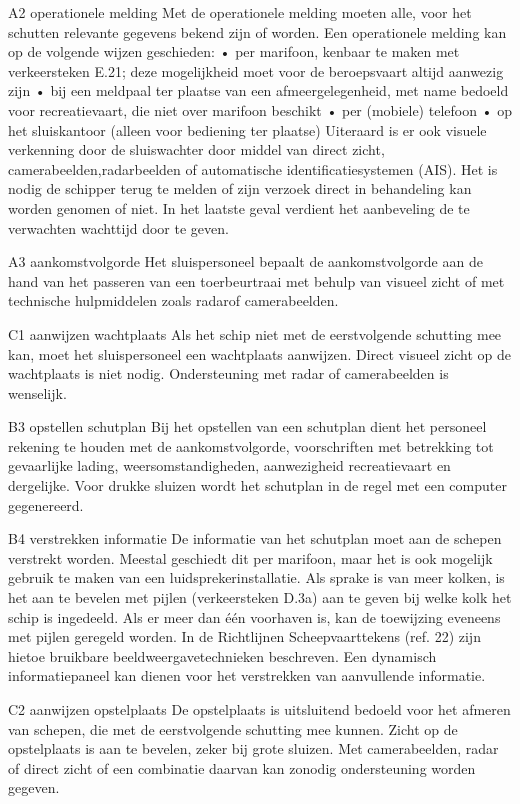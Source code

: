 A2 operationele melding
Met de operationele melding moeten alle, voor het schutten relevante gegevens bekend
zijn of worden. Een operationele melding kan op de volgende wijzen geschieden:
• per marifoon, kenbaar te maken met verkeersteken E.21; deze mogelijkheid moet voor
de beroepsvaart altijd aanwezig zijn
• bij een meldpaal ter plaatse van een afmeergelegenheid, met name bedoeld voor
recreatievaart, die niet over marifoon beschikt
• per (mobiele) telefoon
• op het sluiskantoor (alleen voor bediening ter plaatse)
Uiteraard is er ook visuele verkenning door de sluiswachter door middel van direct zicht,
camerabeelden,radarbeelden of automatische identificatiesystemen (AIS). Het is nodig
de schipper terug te melden of zijn verzoek direct in behandeling kan worden genomen
of niet. In het laatste geval verdient het aanbeveling de te verwachten wachttijd door te
geven.


A3 aankomstvolgorde
Het sluispersoneel bepaalt de aankomstvolgorde aan de hand van het passeren van een
toerbeurtraai met behulp van visueel zicht of met technische hulpmiddelen zoals radarof camerabeelden.

C1 aanwijzen wachtplaats
Als het schip niet met de eerstvolgende schutting mee kan, moet het sluispersoneel een
wachtplaats aanwijzen. Direct visueel zicht op de wachtplaats is niet nodig.
Ondersteuning met radar of camerabeelden is wenselijk.

B3 opstellen schutplan
Bij het opstellen van een schutplan dient het personeel rekening te houden met de
aankomstvolgorde, voorschriften met betrekking tot gevaarlijke lading, weersomstandigheden, aanwezigheid recreatievaart en dergelijke. Voor drukke sluizen wordt het
schutplan in de regel met een computer gegenereerd.

B4 verstrekken informatie
De informatie van het schutplan moet aan de schepen verstrekt worden. Meestal
geschiedt dit per marifoon, maar het is ook mogelijk gebruik te maken van een luidsprekerinstallatie. Als sprake is van meer kolken, is het aan te bevelen met pijlen
(verkeersteken D.3a) aan te geven bij welke kolk het schip is ingedeeld. Als er meer dan
één voorhaven is, kan de toewijzing eveneens met pijlen geregeld worden. In de
Richtlijnen Scheepvaarttekens (ref. 22) zijn hietoe bruikbare beeldweergavetechnieken
beschreven. Een dynamisch informatiepaneel kan dienen voor het verstrekken van
aanvullende informatie.

C2 aanwijzen opstelplaats
De opstelplaats is uitsluitend bedoeld voor het afmeren van schepen, die met de
eerstvolgende schutting mee kunnen. Zicht op de opstelplaats is aan te bevelen,
zeker bij grote sluizen. Met camerabeelden, radar of direct zicht of een combinatie
daarvan kan zonodig ondersteuning worden gegeven.

